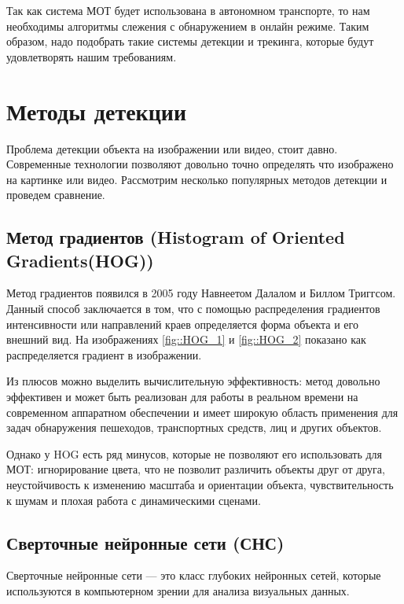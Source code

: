Так как система МОТ будет использована в автономном транспорте, то нам необходимы алгоритмы слежения с обнаружением в онлайн режиме. Таким образом, надо подобрать такие системы детекции и трекинга, которые будут удовлетворять нашим требованиям.

\section{Методы детекции}

Проблема детекции объекта на изображении или видео, стоит давно. Современные технологии позволяют довольно точно определять что изображено на картинке или видео. Рассмотрим несколько популярных методов детекции и проведем сравнение.

\subsection{Метод градиентов (Histogram of Oriented Gradients(HOG))}

Метод градиентов появился в 2005 году Навнеетом Далалом и Биллом Триггсом. Данный способ заключается в том, что с помощью распределения градиентов интенсивности или направлений краев определяется форма объекта и его внешний вид. На изображениях \ref{fig::HOG_1} и \ref{fig::HOG_2} показано как распределяется градиент в изображении.


Из плюсов можно выделить вычислительную эффективность: метод довольно эффективен и может быть реализован для работы в реальном времени на современном аппаратном обеспечении и имеет широкую область применения для задач обнаружения пешеходов, транспортных средств, лиц и других объектов. 


Однако у HOG есть ряд минусов, которые не позволяют его использовать для МОТ: игнорирование цвета, что не позволит различить объекты друг от друга, неустойчивость к изменению масштаба и ориентации объекта, чувствительность к шумам и плохая работа с динамическими сценами.  

\subsection{Сверточные нейронные сети (СНС)}

Сверточные нейронные сети --- это класс глубоких нейронных сетей, которые используются в компьютерном зрении для анализа визуальных данных. 

